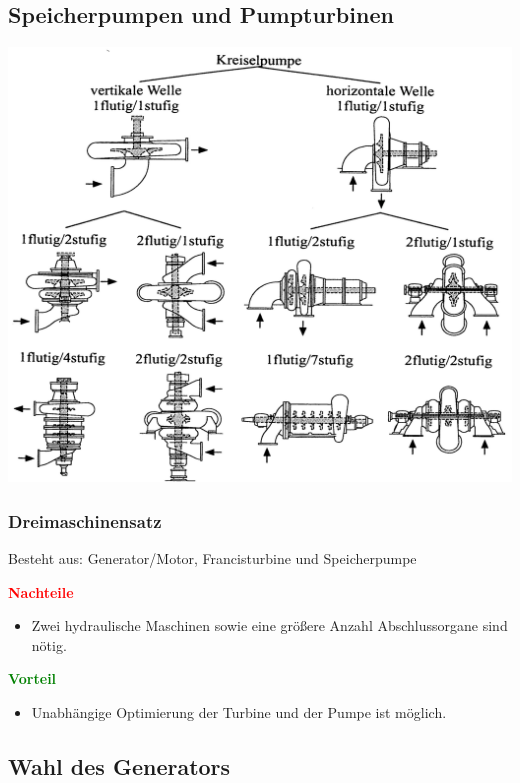 \subsection{Speicherpumpen und Pumpturbinen}
\includegraphics[width=0.98\columnwidth, align=c]{images/Speicherpumpen und Pumpturbinen.png}   

\subsubsection{Dreimaschinensatz}

Besteht aus: Generator/Motor, Francisturbine und Speicherpumpe

\vspace{0.15cm}

    \textcolor{red}{\textbf{Nachteile}} 
    \begin{itemize}
        \item Zwei hydraulische Maschinen sowie eine größere Anzahl Abschlussorgane sind nötig.
    \end{itemize}
    \textcolor{green}{\textbf{Vorteil}}
    \begin{itemize}
        \item Unabhängige Optimierung der Turbine und der Pumpe ist möglich.
    \end{itemize}




\subsection{Wahl des Generators}

